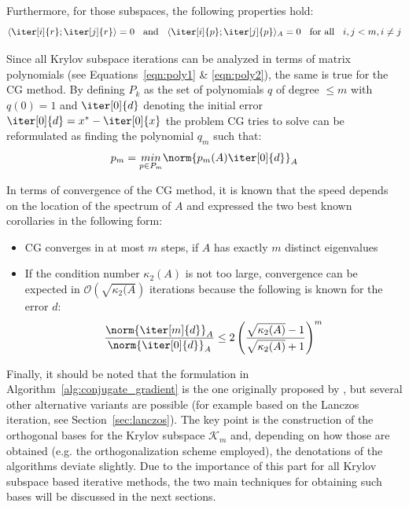 \noindent Furthermore, for those subspaces, the following properties hold:
\begin{equation}
    \langle\iter[i]{r};\iter[j]{r}\rangle =0 \;\; \text{ and } \;\; \langle\iter[i]{p};\iter[j]{p}\rangle_A =0
    \;\; \text{ for all }\;\; i,j <m, i \neq j
\end{equation}

\noindent Since all Krylov subspace iterations can be analyzed in terms of matrix polynomials (see Equations~\hyperref[eqn:poly1]{\ref{eqn:poly1}} \& \hyperref[eqn:poly2]{\ref{eqn:poly2}}), the same is true for the CG method. By defining $P_k$ as the set of polynomials $q$ of degree $\leq m$ with $q(0)=1$ and $\iter[0]{d}$ denoting the initial error $\iter[0]{d} = x^*-\iter[0]{x}$ the problem CG tries to solve can be reformulated as finding the polynomial $q_m$ such that:
\begin{equation}
\label{eqn:cg_poly}
    p_m = \underset{p\in P_m}{min} \norm{p_m(A)\iter[0]{d}}_A
\end{equation}

\noindent In terms of convergence of the CG method, it is known that the speed depends on the location of the spectrum of $A$ and \cite{trefethen_numerical_1997} expressed the two best known corollaries in the following form:
\begin{itemize}
    \item CG converges in at most $m$ steps, if $A$ has exactly $m$ distinct eigenvalues
    \item If the condition number $\kappa_2(A) $ is not too large, convergence can be expected in $\mathcal{O}(\sqrt{\kappa_2(A})$ iterations because the following is known for the error $d$:
\begin{equation}
        \frac{\norm{\iter[m]{d}}_A}{\norm{\iter[0]{d}}_A} \leq 2 \left( \frac{\sqrt{\kappa_2(A)}-1}{\sqrt{\kappa_2(A)}+1}\right)^m
\end{equation}
\end{itemize}

\noindent Finally, it should be noted that the formulation in Algorithm~\hyperref[alg:conjugate_gradient]{\ref{alg:conjugate_gradient}} is the one originally proposed by \cite{hestenes_methods_1952}, but several other alternative variants are possible (for example based on the Lanczos iteration, see Section~\hyperref[sec:lanczos]{\ref{sec:lanczos}}). The key point is the construction of the orthogonal bases for the Krylov subspace $\mathcal{K}_m$ and, depending on how those are obtained (e.g. the orthogonalization scheme employed), the denotations of the algorithms deviate slightly. Due to the importance of this part for all Krylov subspace based iterative methods, the two main techniques for obtaining such bases will be discussed in the next sections.


